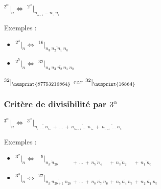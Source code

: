 \documentclass[a4paper, twoside]{article}
\begin{document}
	\begin{center}
		\huge
		$ ^{2^{\alpha}}|_n \Leftrightarrow$ $^{2^{\alpha}}|_{\overline{n_{_{\alpha - 1}}~\dots~n_{_1}~n_{_0}}} $
	\end{center}

	Exemples :

	\begin{Large}
	\begin{itemize}

		\item[] $ ^{2^{4}}|_n \Leftrightarrow$ $^{16}|_{\overline{n_3~n_2~n_1~n_0}} $
		\item[] $ ^{2^{5}}|_n \Leftrightarrow$ $^{32}|_{\overline{n_4~n_3~n_2~n_1~n_0}} $\\

	\end{itemize}
	\end{Large}

	{\Large $^{32}|_{\numprint{87 753 216 864}}$} car {\Large $^{32}|_{\numprint{16 864}}$ }

	\vfill
	{\noindent \dotfill}

	\subsubsection*{Critère de divisibilité par $3^\alpha$}

	\begin{center}
		\huge
		$ ^{3^{\alpha}}|_n \Leftrightarrow$ $^{3^{\alpha}}|_{\overline{n_{_{k}}~\dots~n_{_{b\alpha}}}~+~\dots~+~\overline{n_{_{2\alpha - 1}}~\dots~n_{_{1\alpha}}}~+~\overline{n_{_{\alpha -1}}~\dots~n_{_0}}} $
	\end{center}


	Exemples :

	\begin{Large}
	\begin{itemize}

		\item[] $ ^{3^{2}}|_n \Leftrightarrow$ $^{\phantom{0}9}|_{\overline{n_k~n_{2b}}\phantom{~n_{2b + 1}}~+~\dots~+~\overline{n_5~n_4}\phantom{~n_3}~+~\overline{n_3~n_2}\phantom{~n_3}~+~\overline{n_1~n_0}} $
		\item[] $ ^{3^{3}}|_n \Leftrightarrow$ $^{27}|_{\overline{n_k~n_{2b + 1}~n_{2b}}~+~\dots~+~\overline{n_8~n_7~n_6}~+~\overline{n_5~n_4~n_3}~+~\overline{n_2~n_1~n_0}} $\\

	\end{itemize}
	\end{Large}
\end{document}
